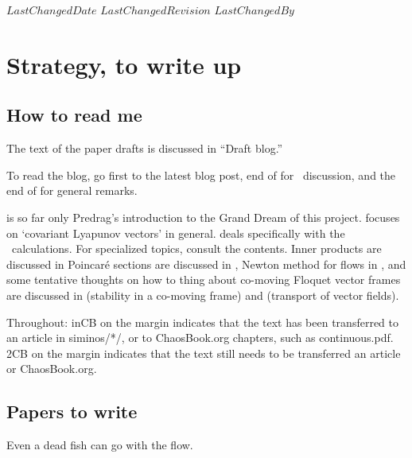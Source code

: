 \ifsvnmulti
 {$LastChangedDate$}
 {$LastChangedRevision$} {$LastChangedBy$}
\fi

\chapter{Strategy, to write up}

\section{How to read me}

The text of the paper drafts is discussed in 
``Draft blog.''

To read the blog, go first to the latest blog post, end
of  for \KS\ discussion, and the end
of  for general remarks.

 is so far only Predrag's introduction to the Grand
Dream of this project.  focuses on `covariant
Lyapunov vectors' in general.  deals specifically
with the \KS\ calculations.
For specialized topics, consult the contents. Inner products are
discussed in  Poincar\'e sections are discussed
in , Newton method for flows in
, and some tentative thoughts on how to thing about
co-moving Floquet vector frames are discussed in
 (stability in a co-moving frame) and
 (transport of vector fields).

Throughout:  {\footnotesize inCB} on the margin                 \inCB
indicates that the text has been transferred to an
article in siminos/*/,  or to ChaosBook.org
chapters, such as
{continuous.pdf}.
 {\footnotesize 2CB} on the margin indicates that the text
still needs to be transferred an article or ChaosBook.org.      \toCB


\section{Papers to write}

\begin{bartlett}{
Even a dead fish can go with the flow.}
\end{bartlett}


